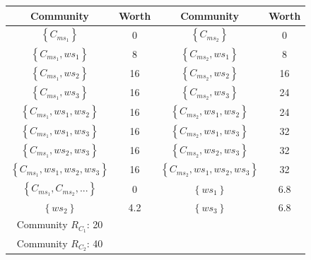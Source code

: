 \begin{table}[!t]
\renewcommand{\arraystretch}{1.3}
\label{example_3_2}
\centering
\begin{tabular}{c c || c c}
\hline
Community & Worth & Community & Worth\\
\hline
$\left\{C_{ms_1}\right\}$ & 0 & $\left\{C_{ms_2}\right\}$ & 0\\
$\left\{C_{ms_1}, ws_1\right\}$ & 8 & $\left\{C_{ms_2}, ws_1\right\}$ & 8\\
$\left\{C_{ms_1}, ws_2\right\}$ & 16 & $\left\{C_{ms_2}, ws_2\right\}$ & 16\\
$\left\{C_{ms_1}, ws_3\right\}$ & 16 & $\left\{C_{ms_2}, ws_3\right\}$ & 24\\
$\left\{C_{ms_1}, ws_1, ws_2\right\}$ & 16 & $\left\{C_{ms_2}, ws_1, ws_2\right\}$ & 24\\
$\left\{C_{ms_1}, ws_1, ws_3\right\}$ & 16 & $\left\{C_{ms_2}, ws_1, ws_3\right\}$ & 32\\
$\left\{C_{ms_1}, ws_2, ws_3\right\}$ & 16 & $\left\{C_{ms_2}, ws_2, ws_3\right\}$ & 32\\
$\left\{C_{ms_1}, ws_1, ws_2, ws_3\right\}$ & 16 & $\left\{C_{ms_2}, ws_1, ws_2, ws_3\right\}$ & 32\\
$\left\{C_{ms_1}, C_{ms_2}, ...\right\}$ & 0 & $\left\{ws_1\right\}$ & 6.8\\
$\left\{ws_2\right\}$ & 4.2 & $\left\{ws_3\right\}$ & 6.8\\
\hline
Community $R_{C_1}$: 20 \\ Community $R_{C_2}$: 40\\
\hline
\end{tabular}
\end{table}

